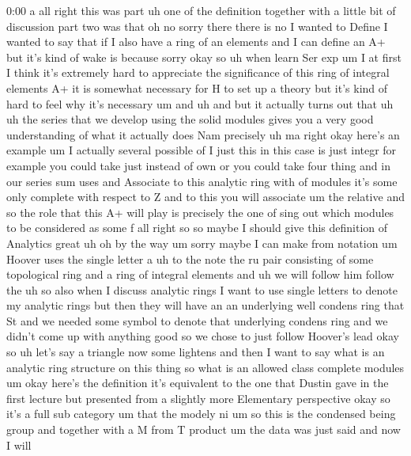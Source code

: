 \begin{unfinished}{0:00}
a  all  right  this  was  part  uh  one  of  the
definition  together  with  a  little  bit  of
discussion  part  two  was
that  oh  no  sorry  there  there  is  no
I  wanted  to  Define  I  wanted  to  say  that
if  I  also  have  a  ring  of  an  elements  and
I  can  define  an  A+  but  it's  kind  of  wake
is
because
sorry
okay  so  uh  when  learn  Ser
exp
um  I  at  first  I  think  it's  extremely
hard  to  appreciate  the  significance  of
this  ring  of  integral  elements  A+  it  is
somewhat  necessary  for  H  to  set  up  a
theory
but  it's  kind  of  hard  to  feel  why  it's
necessary  um
and
uh  and  but  it  actually  turns  out  that  uh
uh  the  series  that  we  develop  using  the
solid  modules  gives  you  a  very  good
understanding  of  what  it  actually  does
Nam
precisely
uh  ma  right  okay  here's  an
example
um
I  actually  several
possible
of  I  just
this  in  this  case  is  just  integr
for  example  you  could  take  just  instead
of
own  or  you  could
take  four
thing  and  in  our  series  sum  uses  and
Associate  to  this  analytic  ring  with  of
modules  it's  some  only  complete  with
respect  to  Z  and  to  this  you  will
associate
um  the
relative  and  so  the  role  that  this  A+
will  play  is  precisely  the  one  of  sing
out  which  modules  to  be  considered  as
some
f  all  right  so  so  maybe  I  should  give
this  definition  of  Analytics  great
uh  oh  by  the  way  um  sorry  maybe  I  can
make  from
notation
um
Hoover  uses  the  single  letter
a  uh  to  the  note  the  ru
pair  consisting  of  some  topological  ring
and  a  ring  of  integral
elements  and  uh  we  will  follow
him
follow
the
uh  so  also  when  I  discuss  analytic  rings
I  want  to  use  single  letters  to  denote
my  analytic  rings  but  then  they  will
have  an  an  underlying  well  condens  ring
that  St  and  we  needed  some  symbol  to
denote  that  underlying  condens  ring  and
we  didn't  come  up  with  anything  good  so
we  chose  to  just  follow  Hoover's
lead  okay  so
uh  let's  say  a  triangle  now  some
lightens  and  then  I  want  to  say  what  is
an  analytic  ring  structure  on  this  thing
so  what  is  an  allowed  class  complete
modules  um  okay  here's  the
definition  it's  equivalent  to  the  one
that  Dustin  gave  in  the  first  lecture
but  presented  from  a  slightly  more
Elementary
perspective
okay
so  it's  a  full  sub
category
um  that  the
modely  ni
um
so  this  is  the  condensed  being
group  and  together  with  a  M  from  T
product
um  the  data  was  just  said  and  now  I  will

\end{unfinished}
